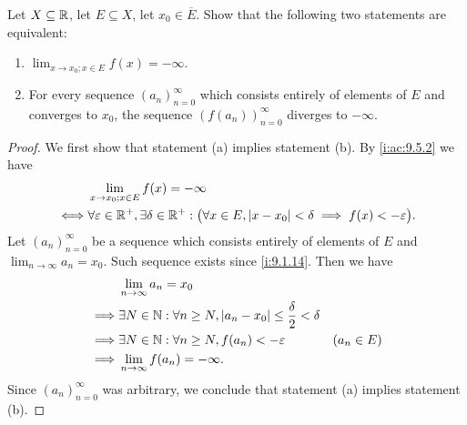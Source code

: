 \begin{ac}\label{i:ac:9.5.4}
  Let \(X \subseteq \mathbb{R}\), let \(E \subseteq X\), let \(x_0 \in \overline{E}\).
  Show that the following two statements are equivalent:
  \begin{enumerate}
    \item \(\lim_{x \to x_0 ; x \in E} f(x) = -\infty\).
    \item For every sequence \((a_n)_{n = 0}^\infty\) which consists entirely of elements of \(E\) and converges to \(x_0\), the sequence \((f(a_n))_{n = 0}^\infty\) diverges to \(-\infty\).
  \end{enumerate}
\end{ac}

\begin{proof}
  We first show that statement (a) implies statement (b).
  By \cref{i:ac:9.5.2} we have
  \begin{align*}
         & \lim_{x \to x_0 ; x \in E} f(x) = -\infty                                                                                               \\
    \iff & \forall \varepsilon \in \mathbb{R}^+, \exists \delta \in \mathbb{R}^+ : \big(\forall x \in E, \left\lvert x - x_0\right\rvert < \delta \implies f(x) < -\varepsilon\big).
  \end{align*}
  Let \((a_n)_{n = 0}^\infty\) be a sequence which consists entirely of elements of \(E\) and \(\lim_{n \to \infty} a_n = x_0\).
  Such sequence exists since \cref{i:9.1.14}.
  Then we have
  \begin{align*}
             & \lim_{n \to \infty} a_n = x_0                                                                      \\
    \implies & \exists N \in \mathbb{N} : \forall n \geq N, \left\lvert a_n - x_0\right\rvert \leq \dfrac{\delta}{2} < \delta               \\
    \implies & \exists N \in \mathbb{N} : \forall n \geq N, f(a_n) < -\varepsilon                           & (a_n \in E) \\
    \implies & \lim_{n \to \infty} f(a_n) = -\infty.
  \end{align*}
  Since \((a_n)_{n = 0}^\infty\) was arbitrary, we conclude that statement (a) implies statement (b).


\end{proof}
